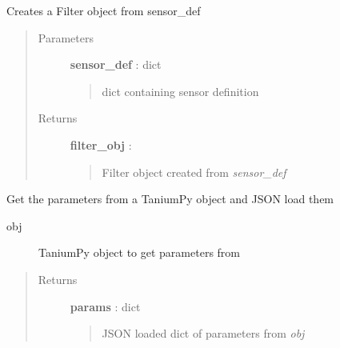 \documentclass[letterpaper,10pt,english]{sphinxmanual}
\begin{document}

\begin{fulllineitems}
\label{pytan.utils:pytan.utils.get_filter_obj}
Creates a Filter object from sensor\_def
\begin{quote}\begin{description}
\item[{Parameters}] \leavevmode
\textbf{sensor\_def} : dict
\begin{quote}

dict containing sensor definition
\end{quote}

\item[{Returns}] \leavevmode
\textbf{filter\_obj} : {\hyperref[taniumpy.object_types:taniumpy.object_types.filter.Filter]{}}
\begin{quote}

Filter object created from \emph{sensor\_def}
\end{quote}

\end{description}\end{quote}

\end{fulllineitems}


\begin{fulllineitems}
\label{pytan.utils:pytan.utils.get_obj_params}
Get the parameters from a TaniumPy object and JSON load them
\begin{description}
\item[{obj}] 
TaniumPy object to get parameters from

\end{description}
\begin{quote}\begin{description}
\item[{Returns}] \leavevmode
\textbf{params} : dict
\begin{quote}

JSON loaded dict of parameters from \emph{obj}
\end{quote}

\end{description}\end{quote}

\end{fulllineitems}
\end{document}
